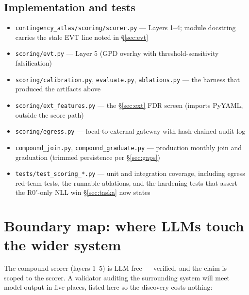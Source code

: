 \documentclass[11pt]{article}
\begin{document}
\subsection{Implementation and tests}

\begin{itemize}[leftmargin=1.4em,itemsep=1pt]
\item \texttt{contingency\_atlas/scoring/scorer.py} --- Layers 1--4; module
  docstring carries the stale EVT line noted in \S\ref{sec:evt}
\item \texttt{scoring/evt.py} --- Layer 5 (GPD overlay with
  threshold-sensitivity falsification)
\item \texttt{scoring/calibration.py}, \texttt{evaluate.py},
  \texttt{ablations.py} --- the harness that produced the artifacts above
\item \texttt{scoring/ext\_features.py} --- the \S\ref{sec:ext} FDR screen
  (imports PyYAML, outside the score path)
\item \texttt{scoring/egress.py} --- local-to-external gateway with
  hash-chained audit log
\item \texttt{compound\_join.py}, \texttt{compound\_graduate.py} ---
  production monthly join and graduation (trimmed persistence per
  \S\ref{sec:gaps})
\item \texttt{tests/test\_scoring\_*.py} --- unit and integration coverage,
  including egress red-team tests, the runnable ablations, and the
  hardening tests that assert the R0$'$-only NLL win \S\ref{sec:taska} now
  states
\end{itemize}

\section{Boundary map: where LLMs touch the wider system}
\label{app:boundary}

The compound scorer (layers 1--5) is LLM-free --- verified, and the claim is
scoped to the scorer. A validator auditing the surrounding system will meet
model output in five places, listed here so the discovery costs nothing:
\end{document}
